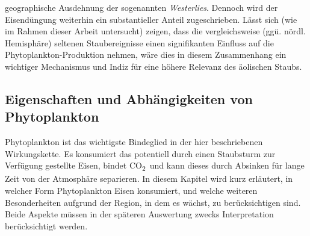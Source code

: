 \documentclass[12pt,a4paper,onecolumn,headheight=30pt]{scrartcl}
\newcommand{\cotwo}{CO\textsubscript{2}}
\begin{document}
geographische Ausdehnung der sogenannten \textit{Westerlies}. Dennoch wird der Eisendüngung weiterhin ein substantieller Anteil zugeschrieben. Lässt sich (wie im Rahmen dieser Arbeit untersucht) zeigen, dass die vergleichsweise (ggü. nördl. Hemisphäre) seltenen Staubereignisse einen signifikanten Einfluss auf die Phytoplankton-Produktion nehmen, wäre dies in diesem Zusammenhang ein wichtiger Mechanismus und Indiz für eine höhere Relevanz des äolischen Staubs.
\subsection{Eigenschaften und Abhängigkeiten von Phytoplankton} \label{sec:Phytoplankton}
Phytoplankton ist das wichtigste Bindeglied in der hier beschriebenen Wirkungskette. Es konsumiert das potentiell durch einen Staubsturm zur Verfügung gestellte Eisen, bindet \cotwo \ und kann dieses durch Absinken für lange Zeit von der Atmosphäre separieren. In diesem Kapitel wird kurz erläutert, in welcher Form Phytoplankton Eisen konsumiert, und 
welche weiteren Besonderheiten aufgrund der Region, in dem es wächst, zu berücksichtigen sind. Beide Aspekte müssen in der späteren Auswertung zwecks Interpretation berücksichtigt werden.
\end{document}
